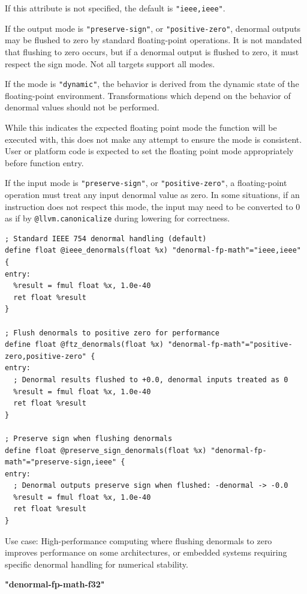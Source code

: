 If this attribute is not specified, the default is \texttt{"ieee,ieee"}.

If the output mode is \texttt{"preserve-sign"}, or \texttt{"positive-zero"}, denormal outputs may be flushed to zero by standard floating-point operations.
It is not mandated that flushing to zero occurs, but if a denormal output is flushed to zero, it must respect the sign mode.
Not all targets support all modes.

If the mode is \texttt{"dynamic"}, the behavior is derived from the dynamic state of the floating-point environment.
Transformations which depend on the behavior of denormal values should not be performed.

While this indicates the expected floating point mode the function will be executed with, this does not make any attempt to ensure the mode is consistent.
User or platform code is expected to set the floating point mode appropriately before function entry.

If the input mode is \texttt{"preserve-sign"}, or \texttt{"positive-zero"}, a floating-point operation must treat any input denormal value as zero.
In some situations, if an instruction does not respect this mode, the input may need to be converted to 0 as if by \texttt{@llvm.canonicalize} during lowering for correctness.

\begin{lstlisting}[style=ir]
; Standard IEEE 754 denormal handling (default)
define float @ieee_denormals(float %x) "denormal-fp-math"="ieee,ieee" {
entry:
  %result = fmul float %x, 1.0e-40
  ret float %result
}

; Flush denormals to positive zero for performance
define float @ftz_denormals(float %x) "denormal-fp-math"="positive-zero,positive-zero" {
entry:
  ; Denormal results flushed to +0.0, denormal inputs treated as 0
  %result = fmul float %x, 1.0e-40
  ret float %result
}

; Preserve sign when flushing denormals
define float @preserve_sign_denormals(float %x) "denormal-fp-math"="preserve-sign,ieee" {
entry:
  ; Denormal outputs preserve sign when flushed: -denormal -> -0.0
  %result = fmul float %x, 1.0e-40
  ret float %result
}
\end{lstlisting}

Use case: High-performance computing where flushing denormals to zero improves performance on some architectures, or embedded systems requiring specific denormal handling for numerical stability.

\textbf{"denormal-fp-math-f32"}

